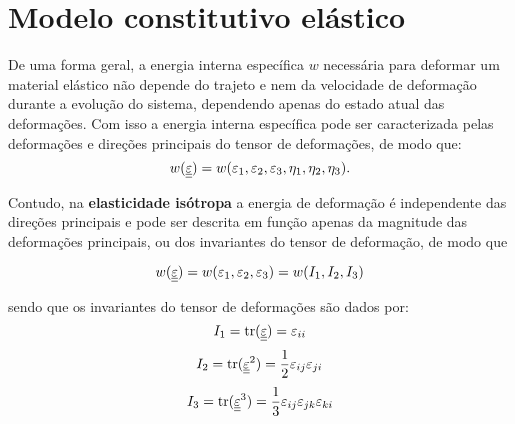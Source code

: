 \section{Modelo constitutivo elástico}

De uma forma geral, a energia interna específica $w$  necessária para deformar um material elástico não depende do trajeto e nem da velocidade de deformação durante a evolução do sistema, dependendo apenas do estado atual das deformações. Com isso a energia interna específica pode ser caracterizada pelas deformações e direções principais do tensor de deformações, de modo que:
\begin{equation}
	\label{eq:energia_interna_elastica}
	w(\underline{\underline \varepsilon}) = w(\varepsilon_1,\varepsilon_2,\varepsilon_3,\eta_1,\eta_2,\eta_3).
\end{equation}

Contudo, na \textbf{elasticidade isótropa} a energia de deformação é independente das direções principais e pode ser descrita em função apenas da magnitude das deformações principais, ou dos invariantes do tensor de deformação, de modo que

\begin{equation}
	\label{eq:energia_interna_elastica_isotropa}
	w(\underline{\underline \varepsilon}) = w(\varepsilon_1,\varepsilon_2,\varepsilon_3) = w(I_1,I_2,I_3)
\end{equation}

sendo que os invariantes do tensor de deformações são dados por:
\begin{equation}
	\label{eq:I1}
	I_1 = \text{tr}(\underline{\underline \varepsilon}) = \varepsilon_{ii}
\end{equation}
\begin{equation}
	\label{eq:I2}
	I_2 = \text{tr}(\underline{\underline \varepsilon}^2) = \frac{1}{2} \varepsilon_{ij} \varepsilon_{ji}
\end{equation}
\begin{equation}
	\label{eq:I3}
	I_3 = \text{tr}(\underline{\underline \varepsilon}^3) = \frac{1}{3} \varepsilon_{ij} \varepsilon_{jk} \varepsilon_{ki}
\end{equation}

